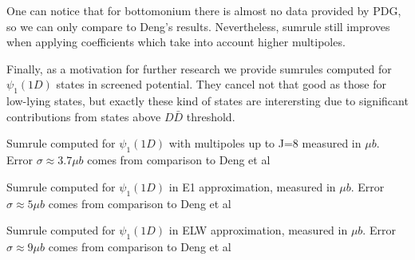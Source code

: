 One can notice that for bottomonium there is almost no data provided by PDG, so we can only compare to Deng's results. Nevertheless, sumrule still improves when applying coefficients which take into account higher multipoles.

Finally, as a motivation for further research we provide sumrules computed for $\psi_1(1D)$ states in screened potential. They cancel not that good as those for low-lying states, but exactly these kind of states are interersting due to significant contributions from states above $D\bar{D}$ threshold.

\begin{table}[H]
    {\caption{Sumrule computed for $\psi_1(1D)$ with multipoles up to J=8 measured in $\mu b$. Error $\sigma \approx 3.7 \mu b$ comes from comparison to Deng et al \label{tab:sr.psi_1_1D.c-scr}}}
    
\end{table}

\begin{table}[H]
    {\caption{Sumrule computed for $\psi_1(1D)$ in E1 approximation, measured in $\mu b$. Error $\sigma \approx 5 \mu b$ comes from comparison to Deng et al \label{tab:srE1.psi_1_1D.c-scr}}}
    
\end{table}

\begin{table}[H]
    {\caption{Sumrule computed for $\psi_1(1D)$ in ELW approximation, measured in $\mu b$. Error $\sigma \approx 9 \mu b$ comes from comparison to Deng et al \label{tab:srELW.psi_1_1D.c-scr}}}
    
\end{table}
